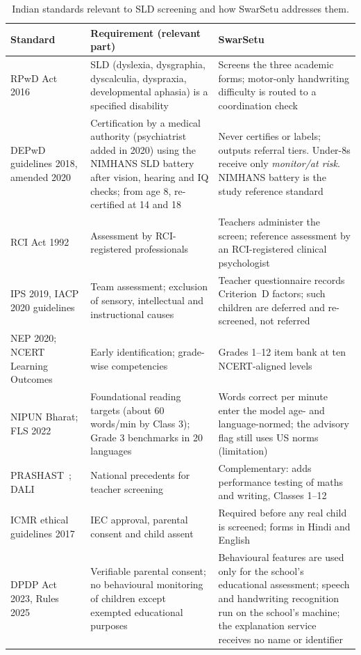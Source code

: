 \documentclass[conference]{IEEEtran}
\begin{document}
\begin{table}[!t]
\centering
\caption{Indian standards relevant to SLD screening and how SwarSetu addresses them.}
\label{tab:india}
\footnotesize
\setlength{\tabcolsep}{4pt}
\begin{tabular}{@{}p{3.6cm}p{6.3cm}p{6.8cm}@{}}
\toprule
Standard & Requirement (relevant part) & SwarSetu \\
\midrule
RPwD Act 2016~\cite{rpwd2016} & SLD (dyslexia, dysgraphia, dyscalculia, dyspraxia, developmental aphasia) is a specified disability & Screens the three academic forms; motor-only handwriting difficulty is routed to a coordination check \\
DEPwD guidelines 2018, amended 2020~\cite{depwd2018} & Certification by a medical authority (psychiatrist added in 2020) using the NIMHANS SLD battery after vision, hearing and IQ checks; from age 8, re-certified at 14 and 18 & Never certifies or labels; outputs referral tiers. Under-8s receive only \emph{monitor/at risk}. NIMHANS battery is the study reference standard \\
RCI Act 1992 & Assessment by RCI-registered professionals & Teachers administer the screen; reference assessment by an RCI-registered clinical psychologist \\
IPS 2019, IACP 2020 guidelines~\cite{shah2019ips,iacp2020} & Team assessment; exclusion of sensory, intellectual and instructional causes & Teacher questionnaire records Criterion~D factors; such children are deferred and re-screened, not referred \\
NEP 2020; NCERT Learning Outcomes~\cite{ncert2017lo} & Early identification; grade-wise competencies & Grades 1--12 item bank at ten NCERT-aligned levels \\
NIPUN Bharat; FLS 2022~\cite{fls2022} & Foundational reading targets (about 60 words/min by Class 3); Grade 3 benchmarks in 20 languages & Words correct per minute enter the model age- and language-normed; the advisory flag still uses US norms (limitation) \\
PRASHAST~\cite{prashast2022}; DALI~\cite{dali2021} & National precedents for teacher screening & Complementary: adds performance testing of maths and writing, Classes 1--12 \\
ICMR ethical guidelines 2017~\cite{icmr2017} & IEC approval, parental consent and child assent & Required before any real child is screened; forms in Hindi and English \\
DPDP Act 2023, Rules 2025~\cite{dpdp2023} & Verifiable parental consent; no behavioural monitoring of children except exempted educational purposes & Behavioural features are used only for the school's educational assessment; speech and handwriting recognition run on the school's machine; the explanation service receives no name or identifier \\
\bottomrule
\end{tabular}
\end{table}
\end{document}
